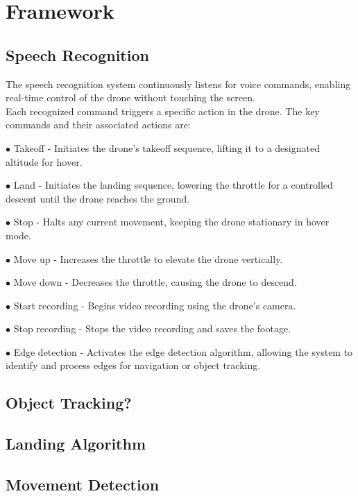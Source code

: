 \documentclass[3p,times]{elsarticle}
\begin{document}
    \section{Framework} \label{sec:framework}
    \subsection{Speech Recognition}
    The speech recognition system continuously listens for voice commands, enabling real-time control of the drone without touching the screen. \\
    Each recognized command triggers a specific action in the drone. The key commands and their associated actions are:
    \begin{description}
        \item $\bullet$ Takeoff - Initiates the drone's takeoff sequence, lifting it to a designated altitude for hover.
        \item $\bullet$ Land - Initiates the landing sequence, lowering the throttle for a controlled descent until the drone reaches the ground.
        \item $\bullet$ Stop - Halts any current movement, keeping the drone stationary in hover mode.
        \item $\bullet$ Move up - Increases the throttle to elevate the drone vertically.
        \item $\bullet$ Move down - Decreases the throttle, causing the drone to descend.
        \item $\bullet$ Start recording - Begins video recording using the drone's camera.
        \item $\bullet$ Stop recording - Stops the video recording and saves the footage.
        \item $\bullet$ Edge detection - Activates the edge detection algorithm, allowing the system to identify and process edges for navigation or object tracking.

    \end{description}
    \subsection{Object Tracking?}
    \subsection{Landing Algorithm}
    \subsection{Movement Detection}
\end{document}

